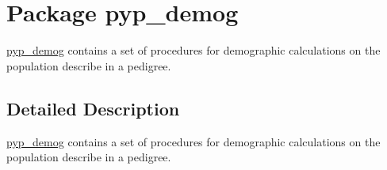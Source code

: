 \hypertarget{namespacepyp__demog}{
\section{Package pyp\_\-demog}
\label{namespacepyp__demog}
}


\hyperlink{namespacepyp__demog}{pyp\_\-demog} contains a set of procedures for demographic calculations on the population describe in a pedigree.  




\subsection{Detailed Description}
\hyperlink{namespacepyp__demog}{pyp\_\-demog} contains a set of procedures for demographic calculations on the population describe in a pedigree. 